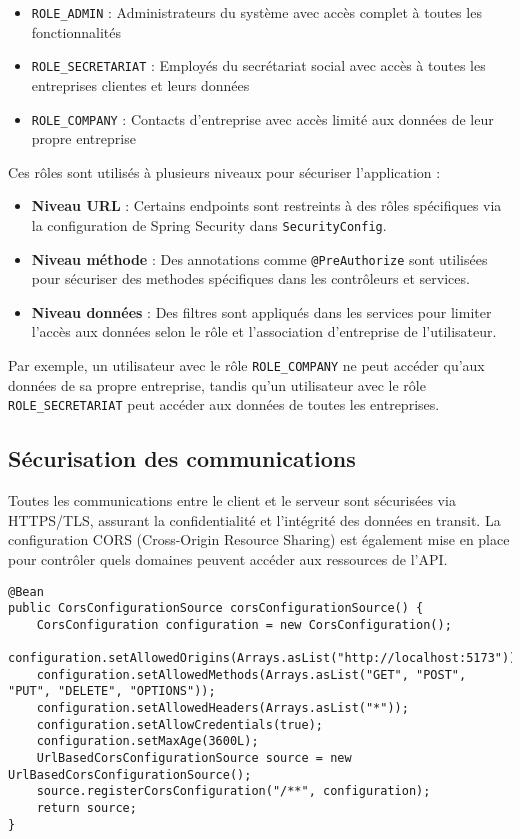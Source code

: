 \begin{itemize}
  \item \texttt{ROLE\_ADMIN} : Administrateurs du système avec accès complet à toutes les fonctionnalités
  \item \texttt{ROLE\_SECRETARIAT} : Employés du secrétariat social avec accès à toutes les entreprises clientes et leurs données
  \item \texttt{ROLE\_COMPANY} : Contacts d'entreprise avec accès limité aux données de leur propre entreprise
\end{itemize}

Ces rôles sont utilisés à plusieurs niveaux pour sécuriser l'application :

\begin{itemize}
  \item \textbf{Niveau URL} : Certains endpoints sont restreints à des rôles spécifiques via la configuration de Spring Security dans \texttt{SecurityConfig}.
  \item \textbf{Niveau méthode} : Des annotations comme \texttt{@PreAuthorize} sont utilisées pour sécuriser des methodes spécifiques dans les contrôleurs et services.
  \item \textbf{Niveau données} : Des filtres sont appliqués dans les services pour limiter l'accès aux données selon le rôle et l'association d'entreprise de l'utilisateur.
\end{itemize}

Par exemple, un utilisateur avec le rôle \texttt{ROLE\_COMPANY} ne peut accéder qu'aux données de sa propre entreprise, tandis qu'un utilisateur avec le rôle \texttt{ROLE\_SECRETARIAT} peut accéder aux données de toutes les entreprises.

\subsection{Sécurisation des communications}

Toutes les communications entre le client et le serveur sont sécurisées via HTTPS/TLS, assurant la confidentialité et l'intégrité des données en transit. La configuration CORS (Cross-Origin Resource Sharing) est également mise en place pour contrôler quels domaines peuvent accéder aux ressources de l'API.

\begin{lstlisting}
@Bean
public CorsConfigurationSource corsConfigurationSource() {
    CorsConfiguration configuration = new CorsConfiguration();
    configuration.setAllowedOrigins(Arrays.asList("http://localhost:5173"));
    configuration.setAllowedMethods(Arrays.asList("GET", "POST", "PUT", "DELETE", "OPTIONS"));
    configuration.setAllowedHeaders(Arrays.asList("*"));
    configuration.setAllowCredentials(true);
    configuration.setMaxAge(3600L);
    UrlBasedCorsConfigurationSource source = new UrlBasedCorsConfigurationSource();
    source.registerCorsConfiguration("/**", configuration);
    return source;
}
\end{lstlisting}

